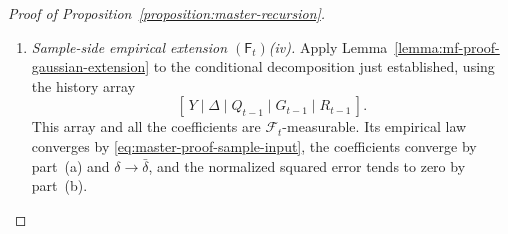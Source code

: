 \begin{proof}[Proof of Proposition~\ref{proposition:master-recursion}]
\begin{enumerate}[wide]
\begin{enumerate}[label=(\alph*),wide]
        $\mathcal F_t$-measurable,
        \[
        \begin{aligned}
            \mathbb E\left[
                \frac{\|\varepsilon_t^{[g]}\|^2}{n}
                \Bigm|\mathcal F_t
            \right]
            =
            \frac{(v_t^{[w]})^2}{n}
            \operatorname{tr}(\Pi_{G_{t-1}})
            =
            \frac{(v_t^{[w]})^2}{n}
            \operatorname{rank}(G_{t-1})
            \leq
            (v_t^{[w]})^2\frac tn.
        \end{aligned}
        \]
        To obtain convergence of the error, the conditional
        Markov inequality
        gives, for $K,\epsilon>0$,
        \[
            \mathbb P\left(
                \frac{\|\varepsilon_t^{[g]}\|^2}{n}
                >\epsilon
            \right)
            \leq
            \mathbb P\bigl((v_t^{[w]})^2>K\bigr)
            +
            \frac{Kt}{n\epsilon}.
        \]
        Choosing $K>(\bar v_t^{[w]})^2$, both terms tend
        to zero. This proves $(\mathsf F_t)$(iii).

        \item \emph{Sample-side empirical extension $(\mathsf F_t)$\textup{(iv)}.}
        Apply
        Lemma~\ref{lemma:mf-proof-gaussian-extension}
        to the conditional decomposition just established,
        using the history array
        \[
            [\,Y\mid\Delta\mid Q_{t-1}
                \mid G_{t-1}\mid R_{t-1}\,].
        \]
        This array and all the coefficients are
        $\mathcal F_t$-measurable.
        Its empirical law converges by
        \eqref{eq:master-proof-sample-input},
        the coefficients converge by part~(a) and
        $\delta\to\bar\delta$, and the normalized squared
        error tends to zero by part~(b).


\end{enumerate}
\end{enumerate}
\end{proof}
